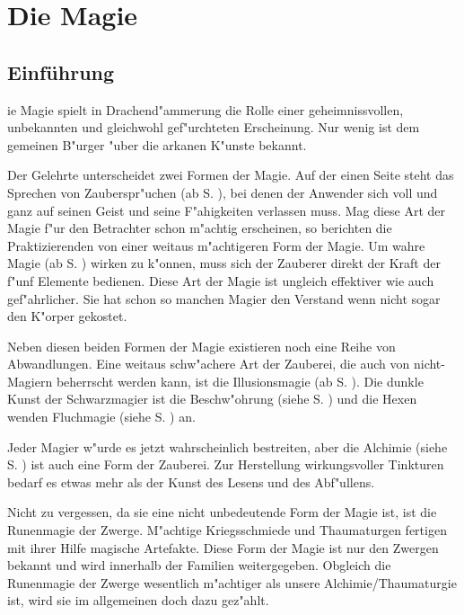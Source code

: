 \chapter{Die Magie}
\label{diemagie}
\section{Einführung}
ie Magie spielt in Drachend"ammerung die Rolle einer geheimnissvollen,
unbekannten und gleichwohl gef"urchteten Erscheinung. Nur wenig ist
dem gemeinen B"urger "uber die arkanen K"unste
bekannt.
\par Der Gelehrte unterscheidet zwei Formen der Magie. Auf der
einen Seite steht das Sprechen von
Zauberspr"uchen (ab S. \pageref{spruchmagie}),
bei denen der Anwender sich voll und ganz auf seinen Geist und seine
F"ahigkeiten verlassen muss. Mag diese Art der Magie f"ur den
Betrachter schon m"achtig erscheinen, so berichten die
Praktizierenden von einer weitaus m"achtigeren Form der Magie. Um
wahre Magie (ab S. \pageref{wahremagie})
wirken zu k"onnen, muss sich der Zauberer direkt der Kraft der f"unf
Elemente bedienen. Diese Art der Magie ist ungleich
effektiver wie auch gef"ahrlicher. Sie hat schon so manchen Magier
den Verstand wenn nicht sogar den K"orper gekostet.
\par Neben diesen beiden Formen der Magie existieren noch eine Reihe von Abwandlungen. Eine weitaus schw"achere Art der Zauberei, die auch von nicht-Magiern beherrscht werden kann, ist die Illusionsmagie (ab S. \pageref{illusionsmagie}). Die dunkle Kunst der Schwarzmagier ist die Beschw"ohrung (siehe S. \pageref{beschwoerungen}) und die Hexen wenden Fluchmagie (siehe S. \pageref{fluchmagie}) an.
\par Jeder Magier w"urde es jetzt wahrscheinlich bestreiten, aber die Alchimie (siehe S. \pageref{alchimie}) ist auch eine Form der Zauberei. Zur Herstellung wirkungsvoller Tinkturen bedarf es etwas mehr als der Kunst des Lesens und des Abf"ullens.
\par Nicht zu vergessen, da sie eine nicht unbedeutende Form der Magie ist, ist die Runenmagie der Zwerge. M"achtige Kriegsschmiede und Thaumaturgen fertigen mit ihrer Hilfe magische Artefakte. Diese Form der Magie ist nur den Zwergen bekannt und wird innerhalb der Familien weitergegeben. Obgleich die Runenmagie der Zwerge wesentlich m"achtiger als unsere Alchimie/Thaumaturgie ist, wird sie im allgemeinen doch dazu gez"ahlt.







